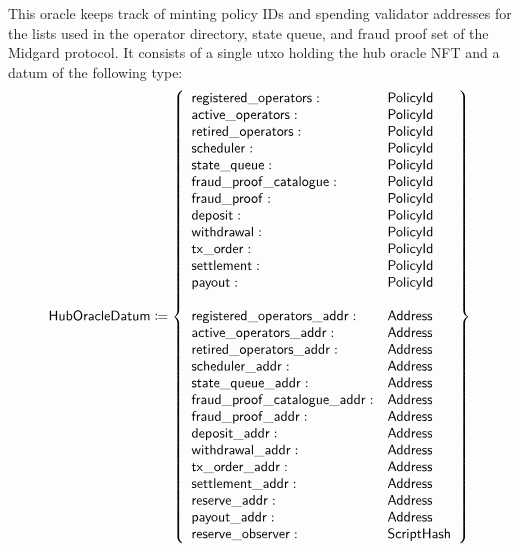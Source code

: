 \documentclass[../midgard.tex]{subfiles}
\begin{document}
This oracle keeps track of minting policy IDs and spending validator addresses for the lists used in the operator directory, state queue, and fraud proof set of the Midgard protocol.
It consists of a single utxo holding the hub oracle NFT and a datum of the following type:
\begin{equation*}
    \mathsf{HubOracleDatum} \coloneq \left\{
    \begin{array}{ll}
        \mathsf{registered\_operators} : & \mathsf{PolicyId} \\
        \mathsf{active\_operators} : & \mathsf{PolicyId} \\
        \mathsf{retired\_operators} : & \mathsf{PolicyId} \\
        \mathsf{scheduler} : & \mathsf{PolicyId} \\
        \mathsf{state\_queue} : & \mathsf{PolicyId} \\
        \mathsf{fraud\_proof\_catalogue} : & \mathsf{PolicyId} \\
        \mathsf{fraud\_proof} : & \mathsf{PolicyId} \\
        \mathsf{deposit} : & \mathsf{PolicyId} \\
        \mathsf{withdrawal} : & \mathsf{PolicyId} \\
        \mathsf{tx\_order} : & \mathsf{PolicyId} \\
        \mathsf{settlement} : & \mathsf{PolicyId} \\
        \mathsf{payout} : & \mathsf{PolicyId} \\
        \\
        \mathsf{registered\_operators\_addr} : & \mathsf{Address} \\
        \mathsf{active\_operators\_addr} : & \mathsf{Address} \\
        \mathsf{retired\_operators\_addr} : & \mathsf{Address} \\
        \mathsf{scheduler\_addr} : & \mathsf{Address} \\
        \mathsf{state\_queue\_addr} : & \mathsf{Address} \\
        \mathsf{fraud\_proof\_catalogue\_addr} : & \mathsf{Address} \\
        \mathsf{fraud\_proof\_addr} : & \mathsf{Address} \\
        \mathsf{deposit\_addr} : & \mathsf{Address} \\
        \mathsf{withdrawal\_addr} : & \mathsf{Address} \\
        \mathsf{tx\_order\_addr} : & \mathsf{Address} \\
        \mathsf{settlement\_addr} : & \mathsf{Address} \\
        \mathsf{reserve\_addr} : & \mathsf{Address} \\ 
        \mathsf{payout\_addr} : & \mathsf{Address} \\
        \mathsf{reserve\_observer} : & \mathsf{ScriptHash}
    \end{array} \right\}
\end{equation*}
\end{document}

